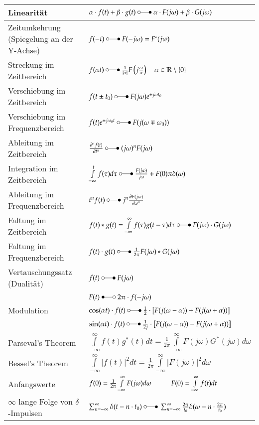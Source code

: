 \begin{tabular}{|l|l|}
	\hline
	Linearität & 
	$\alpha\cdot f(t) + \beta\cdot g(t) \;\laplace\;\alpha\cdot F(j\omega) +
	\beta\cdot G(j\omega)$\\
	\hline
	Zeitumkehrung (Spiegelung an der Y-Achse)&
	$f(-t) \;\laplace\; F(-j\omega) = F^*(jw)$ \\
	\hline        	
	Streckung im Zeitbereich &
	$f(\alpha t) \;\laplace\; \frac{1}{|\alpha|}F \left (j\frac{\omega}{\alpha} \right)
	\quad\alpha \in\mathbb{R}\setminus \{0\}$\\
	\hline
	Verschiebung im	Zeitbereich &
	$f(t\pm t_0) \;\laplace\; F(j\omega)e^{\pm j\omega t_0}$\\
	\hline
	Verschiebung im Frequenzbereich &
	$f(t)e^{\pm j\omega_0 t} \;\laplace\; F(j(\omega\mp\omega_0))$\\
	\hline
	Ableitung im Zeitbereich &
	$\frac{\partial^n f(t)}{\partial t^n} \;\laplace\; (j\omega)^n F(j\omega)$\\
	\hline
	Integration im Zeitbereich &
	$\int\limits_{-\infty}^{t}f(\tau)d\tau \;\laplace\;
	\frac{F(j\omega)}{j\omega}+F(0)\pi\delta(\omega)$\\
	\hline				
	Ableitung im Frequenzbereich &
	$t^n f(t) \;\laplace\; j^n \frac{\partial F(j\omega)}{\partial \omega^n}$\\
	\hline		
	Faltung im Zeitbereich &
	$f(t) \ast g(t) = \int\limits_{-\infty}^{\infty} f(\tau)g(t-\tau)d\tau \;\laplace\;
	F(j\omega) \cdot G(j\omega)$\\
	\hline
	Faltung im Frequenzbereich &
	$f(t) \cdot g(t) \;\laplace\; \frac{1}{2\pi}F(j\omega) \ast G(j\omega)$\\
	\hline
	Vertauschungssatz (Dualität) &
	$f(t) \;\laplace\; F(j\omega)\nonumber$ \\
	& $F(t) \;\Laplace\; 2\pi \cdot f(-j\omega)$\\
	\hline
	Modulation &
	$\cos(\alpha t) \cdot f(t)  \;\laplace\;  \frac{1}{2}\cdot
	\left[F(j(\omega-\alpha)) + F(j(\omega+\alpha))\right ]$\\
	& $\sin(\alpha t) \cdot f(t) \;\laplace\; \frac{1}{2j}\cdot \left[
	F(j(\omega-\alpha)) - F(j(\omega+\alpha))\right ]$\\
	\hline
	Parseval's Theorem &
	$\int\limits_{-\infty}^{\infty}f(t)g^{\ast}(t)dt = \frac{1}{2\pi}
	\int\limits_{-\infty}^{\infty}F(j\omega)G^{\ast}(j\omega)d\omega$\\
	\hline
	Bessel's Theorem &
	$\int\limits_{-\infty}^{\infty}|f(t)|^2 dt = \frac{1}{2\pi}
	\int\limits_{-\infty}^{\infty}|F(j\omega)|^2 d\omega$\\
	\hline 			
	Anfangswerte &
	$f(0)=\frac{1}{2\pi}\int\limits_{-\infty}^{\infty}F(j\omega)d\omega
	\hspace*{1cm} F(0)=\int\limits_{-\infty}^{\infty}f(t)dt$\\
	\hline
	$\infty$ lange Folge von $\delta$-Impulsen &
	$\sum_{n=-\infty}^{\infty} \delta(t-n\cdot t_0) \;\laplace\;
	\sum_{n=-\infty}^{\infty} \frac{2\pi}{t_0}\delta(\omega-n\cdot
	\frac{2\pi}{t_0})$\\
	\hline
\end{tabular}

\clearpage
\pagebreak